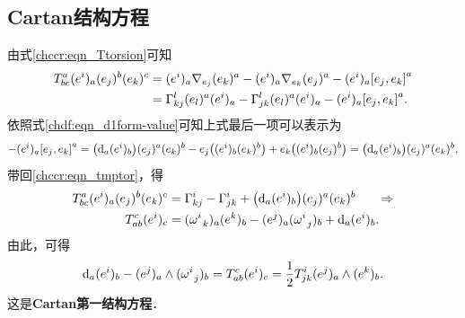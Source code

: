 \subsection{Cartan结构方程}\label{chccr:sec_Cartan-Structure}
由式\eqref{chccr:eqn_Ttorsion}可知
\begin{align}
    T_{bc}^a (e^i)_a (e_j)^b (e_k)^c &= (e^i)_a{\nabla_{e_j}}{(e_k)^a} -
    (e^i)_a{\nabla _{e_k}}{(e_j)^a} - (e^i)_a{\left[ {e_j,e_k} \right]^a} \notag \\
    & = \Gamma_{kj}^l (e_l)^a(e^i)_a - \Gamma_{jk}^l (e_l)^a(e^i)_a-
    (e^i)_a{\left[ {e_j,e_k} \right]^a}.  \label{chccr:eqn_tmptor}
\end{align}
依照式\eqref{chdf:eqn_d1form-value}可知上式最后一项可以表示为
\begin{align*}
    -(e^i)_a{\left[ {e_j,e_k} \right]^a} =\bigl( {\rm d}_a (e^i)_b \bigr) (e_j)^a (e_k)^b
    -e_j \bigl( (e^i)_b (e_k)^b \bigr) + e_k \bigl( (e^i) _b (e_j)^b \bigr) 
    =\bigl( {\rm d}_a (e^i)_b \bigr) (e_j)^a (e_k)^b ,
\end{align*}  %
带回\eqref{chccr:eqn_tmptor}，得
\begin{align*}
    T_{bc}^a (e^i)_a (e_j)^b (e_k)^c & = \Gamma_{kj}^i -\Gamma_{jk}^i
    + \bigl( {\rm d}_a (e^i)_b \bigr) (e_j)^a (e_k)^b  {\qquad  \Rightarrow }   \\
    T_{ab}^c (e^i)_c  & = (\omega _{\hphantom{a} k}^i)_a(e^k)_b 
    -(e^j)_a(\omega _{\hphantom{a} j}^i)_b +  {\rm d}_a (e^i)_b .
\end{align*}
由此，可得
\begin{equation}\label{chccr:eqn_Cartan-Structure-I}
    {\rm d}_a (e^i)_b - (e^j)_a \wedge (\omega _{\hphantom{a} j}^i)_b =T_{ab}^c (e^i)_c
    =\frac{1}{2}T_{jk}^i (e^j)_a \wedge(e^k)_b .
\end{equation}
这是{\heiti \bfseries Cartan第一结构方程}．

